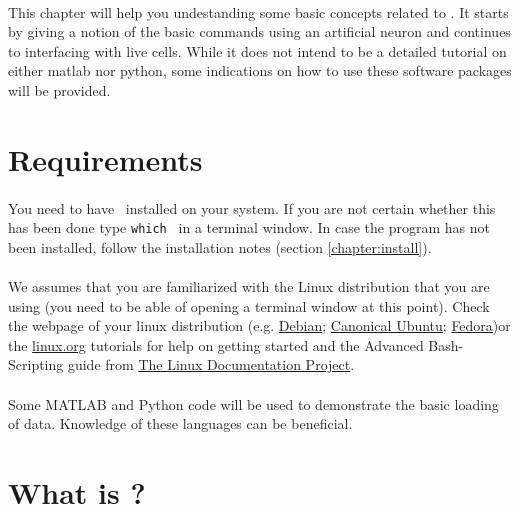 \paragraph{}
This chapter will help you undestanding some basic concepts related to \progname. It starts by giving a notion of the basic commands using an artificial neuron and continues to interfacing with live cells. While it does not intend to be a detailed tutorial on either matlab nor python, some indications on how to use these software packages will be provided.

\section{Requirements}
\paragraph{}
You need to have \progname\ installed on your system. If you are not certain whether this has been done type \texttt{which \progname} in a terminal window. In case the program has not been installed, follow the installation notes (section \ref{chapter:install}).

\paragraph{}
We assumes that you are familiarized with the Linux distribution that you are using (you need to be able of opening a terminal window at this point). Check the webpage of your linux distribution (e.g. \href{http://www.debian.org}{Debian}; \href{http://www.ubuntu.com}{Canonical Ubuntu}; \href{http://www.fedoraproject.org}{Fedora})or the \href{http://www.linux.org/tutorial}{linux.org} tutorials for help on getting started and the Advanced Bash-Scripting guide from \href{http://www.tldp.org}{The Linux Documentation Project}.

\paragraph{}
Some MATLAB and Python code will be used to demonstrate the basic loading of data. Knowledge of these languages can be beneficial.

\paragraph{}

\section{What is \progname?}

